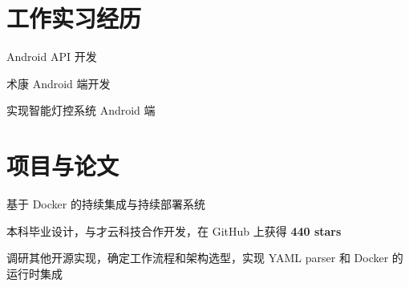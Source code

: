 \documentclass[]{deedy-resume-openfont}
\begin{document}
\begin{minipage}[t]{0.73\textwidth} 


\section{工作实习经历}

\sectionsep
{}
\vspace{\topsep}
\vspace{\topsep}
\begin{tightemize}
\item Android API 开发
\end{tightemize}
\sectionsep

\sectionsep
{}
\vspace{\topsep}
\begin{tightemize}
\item 术康 Android 端开发
\end{tightemize}
\sectionsep

\sectionsep
{}
\vspace{\topsep}
\begin{tightemize}
\item 实现智能灯控系统 Android 端
\end{tightemize}
\sectionsep


\section{项目与论文}
\sectionsep
{}
\begin{tightemize}
    \item 基于 Docker 的持续集成与持续部署系统
    \item 本科毕业设计，与才云科技合作开发，在 GitHub 上获得 \textbf{440 stars}
    \item 调研其他开源实现，确定工作流程和架构选型，实现 YAML parser 和 Docker 的运行时集成
    \end{tightemize}
\sectionsep


\end{minipage}
\end{document}
